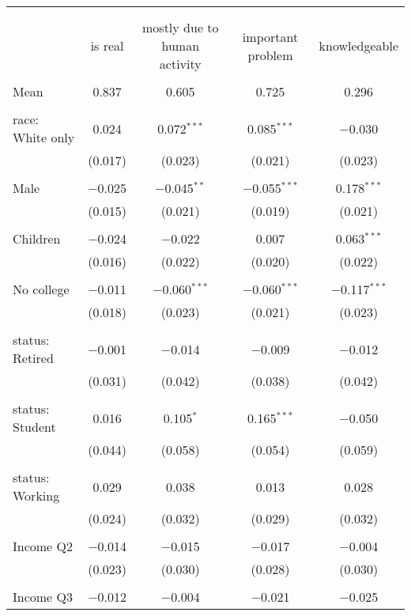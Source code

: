 
\begin{tabular}{@{\extracolsep{5pt}}lcccc} 
\\[-1.8ex]\hline 
\hline \\[-1.8ex] 
\\[-1.8ex] & is real & mostly due to human activity & important problem & knowledgeable \\ 
\hline \\[-1.8ex] 
 Mean & 0.837 & 0.605 & 0.725 & 0.296  \\ \hline \\[-1.8ex] race: White only & 0.024 & 0.072$^{***}$ & 0.085$^{***}$ & $-$0.030 \\ 
  & (0.017) & (0.023) & (0.021) & (0.023) \\ 
  & & & & \\ 
 Male & $-$0.025 & $-$0.045$^{**}$ & $-$0.055$^{***}$ & 0.178$^{***}$ \\ 
  & (0.015) & (0.021) & (0.019) & (0.021) \\ 
  & & & & \\ 
 Children & $-$0.024 & $-$0.022 & 0.007 & 0.063$^{***}$ \\ 
  & (0.016) & (0.022) & (0.020) & (0.022) \\ 
  & & & & \\ 
 No college & $-$0.011 & $-$0.060$^{***}$ & $-$0.060$^{***}$ & $-$0.117$^{***}$ \\ 
  & (0.018) & (0.023) & (0.021) & (0.023) \\ 
  & & & & \\ 
 status: Retired & $-$0.001 & $-$0.014 & $-$0.009 & $-$0.012 \\ 
  & (0.031) & (0.042) & (0.038) & (0.042) \\ 
  & & & & \\ 
 status: Student & 0.016 & 0.105$^{*}$ & 0.165$^{***}$ & $-$0.050 \\ 
  & (0.044) & (0.058) & (0.054) & (0.059) \\ 
  & & & & \\ 
 status: Working & 0.029 & 0.038 & 0.013 & 0.028 \\ 
  & (0.024) & (0.032) & (0.029) & (0.032) \\ 
  & & & & \\ 
 Income Q2 & $-$0.014 & $-$0.015 & $-$0.017 & $-$0.004 \\ 
  & (0.023) & (0.030) & (0.028) & (0.030) \\ 
  & & & & \\ 
 Income Q3 & $-$0.012 & $-$0.004 & $-$0.021 & $-$0.025 \\ 

\end{tabular}
